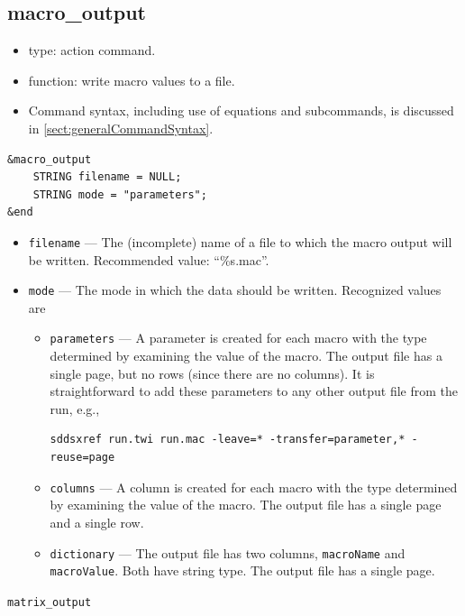 \documentclass[11pt]{article}
\begin{document}
\subsection{macro\_output \label{subsec:macrooutput}}

\begin{itemize}
\item type: action command.
\item function: write macro values to a file.
\item Command syntax, including use of equations and subcommands, is discussed in \ref{sect:generalCommandSyntax}.
\end{itemize}

\begin{verbatim}
&macro_output
    STRING filename = NULL;
    STRING mode = "parameters";
&end
\end{verbatim}

\begin{itemize}
\item \verb|filename| --- The (incomplete) name of a file to which the 
macro output will be written.   Recommended value: ``\%s.mac''.
\item \verb|mode| --- The mode in which the data should be written. Recognized values are
  \begin{itemize}
  \item \verb|parameters| --- A parameter is created for each macro with the type determined by examining the value of the macro.
    The output file has a single page, but no rows (since there are no columns).
    It is straightforward to add these parameters to any other output file from the run, e.g.,
\begin{verbatim}
sddsxref run.twi run.mac -leave=* -transfer=parameter,* -reuse=page
\end{verbatim}
  \item \verb|columns| --- A column is created for each macro with the type determined by examining the value of the macro.
    The output file has a single page and a single row.
  \item \verb|dictionary| --- The output file has two columns, \verb|macroName| and \verb|macroValue|. Both have string type.
    The output file has a single page.
  \end{itemize}
\end{itemize}

\newpage
\begin{center}{\Large\verb|matrix_output|}\end{center}
\end{document}
